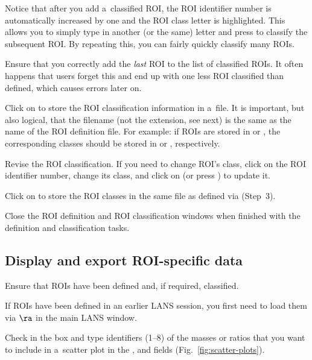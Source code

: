 \bul Notice that after you add a~classified ROI, the ROI identifier number is automatically increased by one and the ROI class letter is highlighted. This allows you to simply type in another (or the same) letter and press  to classify the subsequent ROI. By repeating this, you can fairly quickly classify many ROIs.

\bul Ensure that you correctly add the \emph{last} ROI to the list of classified ROIs. It often happens that users forget this and end up with one less ROI classified than defined, which causes errors later on.

\s Click on  to store the ROI classification information in a~file. It is important, but also logical, that the filename (not the extension, see next) is the same as the name of the ROI definition file. For example: if ROIs are stored in  or , the corresponding classes should be stored in  or , respectively.

\s Revise the ROI classification. If you need to change ROI's class, click on the ROI identifier number, change its class, and click on  (or press ) to update it.

\s Click on  to store the ROI classes in the same file as defined via  (Step~3).

\s Close the ROI definition and ROI classification windows when finished with the definition and classification tasks.


\subsection{Display and export ROI-specific data}
\setcounter{step}{0}

\s Ensure that ROIs have been defined and, if required, classified.

\bul If ROIs have been defined in an earlier LANS session, you first need to load them via  $\ra$  in the main LANS window.

\s Check  in the  box and type identifiers (1--8) of the masses or ratios that you want to include in a~scatter plot in the ,  and  fields (Fig.~\ref{fig:scatter-plots}).

